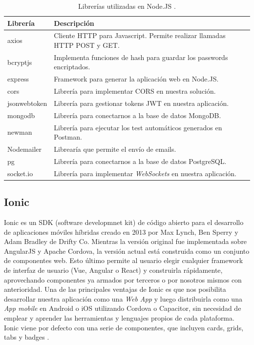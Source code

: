 \begin{table}[h]
	\centering
	\caption[Librerías Node.JS]{Librerías utilizadas en Node.JS .}
	\begin{tabular}{p{4cm} p{8.5cm} } 	

		\toprule
		\textbf{Librería} & 
		\textbf{Descripción}
		\\
		\midrule
axios & Cliente HTTP para Javascript. Permite realizar llamadas HTTP POST y GET.\\
bcryptjs & Implementa funciones de hash para guardar los passwords encriptados.\\
express & Framework para generar la aplicación web en Node.JS.\\
cors & Librería para implementar CORS en nuestra solución.\\
jsonwebtoken & Librería para gestionar tokens JWT en nuestra aplicación.\\
mongodb & Librería para conectarnos a la base de datos MongoDB.\\
newman & Librería para ejecutar los test automáticos generados en Postman. \\
Nodemailer & Librearía que permite el envío de emails.\\
pg & Librería para conectarnos a la base de datos PostgreSQL.\\
socket.io & Librería para implementar \textit{WebSockets} en nuestra aplicación.
\\
		\bottomrule
		\hline
	\end{tabular}
	\label{tab:nodelibrerias}
\end{table}

\pagebreak
\subsection{Ionic}

Ionic es un SDK (software developmnet kit) de código abierto para el desarrollo de aplicaciones móviles híbridas creado en 2013 por Max Lynch, Ben Sperry y Adam Bradley de Drifty Co. Mientras la versión original fue implementada sobre AngularJS y Apache Cordova, la versión actual está construida como un conjunto de componentes web. Esto último permite al usuario elegir cualquier framework de interfaz de usuario (Vue, Angular o React) y construirla rápidamente, aprovechando componentes ya armados por terceros o por nosotros mismos con anterioridad. Una de las principales ventajas de Ionic es que nos posibilita desarrollar nuestra aplicación como una \textit{Web App} y luego distribuirla como una \textit{App mobile} en Android o iOS utilizando Cordova o Capacitor, sin necesidad de emplear y aprender las herramientas y lenguajes propios de cada plataforma. Ionic viene por defecto con una serie de componentes, que incluyen cards, grids, tabs y badges \citep{WEBSITE:ionic}.

